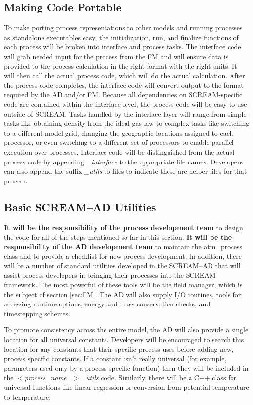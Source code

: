 \documentclass[10pt]{article}
\begin{document}
\subsection{Making Code Portable}
To make porting process representations to other models and running processes as standalone executables easy, the initialization, run, and finalize functions of each process will be broken into interface and process tasks. The interface code will grab needed input for the process from the FM and will ensure data is provided to the process calculation in the right format with the right units. It will then call the actual process code, which will do the actual calculation. After the process code completes, the interface code will convert output to the format required by the AD and/or FM. Because all dependencies on SCREAM-specific code are contained within the interface level, the process code will be easy to use outside of SCREAM. Tasks handled by the interface layer will range from simple tasks like obtaining density from the ideal gas law to complex tasks like switching to a different model grid, changing the geographic locations assigned to each processor, or even switching to a different set of processors to enable parallel execution over processes. Interface code will be distinguished from the actual process code by appending \emph{\_interface} to the appropriate file names. Developers can also append the suffix \emph{\_utils} to files to indicate these are helper files for that process.

\subsection{Basic SCREAM--AD Utilities}

{\bf It will be the responsibility of the process development team} to design the code for all of the steps mentioned so far in this section.  {\bf It will be the responsibility of the AD development team} to maintain the atm\_process class and to provide a checklist for new process development.  In addition, there will be a number of standard utilities developed in the SCREAM--AD that will assist process developers in bringing their processes into the SCREAM framework. The most powerful of these tools will be the field manager, which is the subject of section \ref{sec:FM}. The AD will also supply I/O routines, tools for accessing runtime options, energy and mass conservation checks, and timestepping schemes.

To promote consistency across the entire model, the AD will also provide a single location for all universal constants.  Developers will be encouraged to search this location for any constants that their specific process uses before adding new, process specific constants. If a constant isn't really universal (for example, parameters used only by a process-specific function) then they will be included in the \emph{$<$process\_name\_$>$\_utils} code. Similarly, there will be a C++ class for universal functions like linear regression or conversion from potential temperature to temperature.
\end{document}
